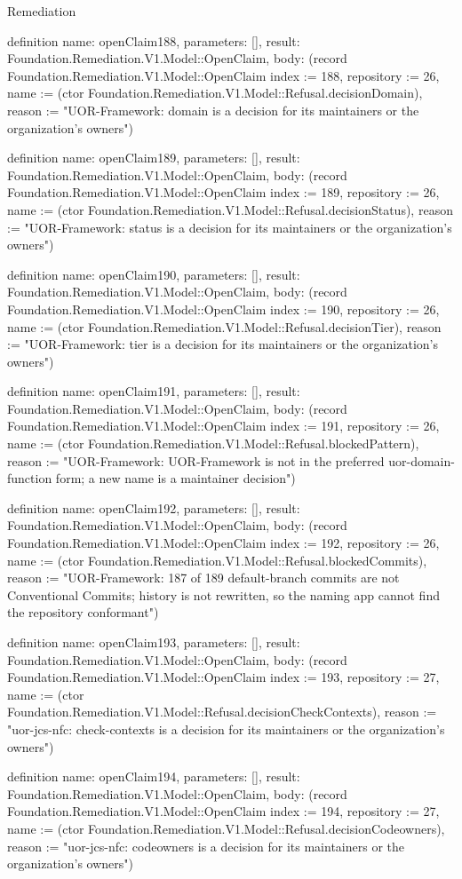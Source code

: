 \begin{lexlean}{Remediation}
\begin{semanticmodule}
definition{
  name: openClaim188,
  parameters: [],
  result: Foundation.Remediation.V1.Model::OpenClaim,
  body: (record Foundation.Remediation.V1.Model::OpenClaim {index := 188, repository := 26, name := (ctor Foundation.Remediation.V1.Model::Refusal.decisionDomain), reason := "UOR-Framework: domain is a decision for its maintainers or the organization's owners"})
}

definition{
  name: openClaim189,
  parameters: [],
  result: Foundation.Remediation.V1.Model::OpenClaim,
  body: (record Foundation.Remediation.V1.Model::OpenClaim {index := 189, repository := 26, name := (ctor Foundation.Remediation.V1.Model::Refusal.decisionStatus), reason := "UOR-Framework: status is a decision for its maintainers or the organization's owners"})
}

definition{
  name: openClaim190,
  parameters: [],
  result: Foundation.Remediation.V1.Model::OpenClaim,
  body: (record Foundation.Remediation.V1.Model::OpenClaim {index := 190, repository := 26, name := (ctor Foundation.Remediation.V1.Model::Refusal.decisionTier), reason := "UOR-Framework: tier is a decision for its maintainers or the organization's owners"})
}

definition{
  name: openClaim191,
  parameters: [],
  result: Foundation.Remediation.V1.Model::OpenClaim,
  body: (record Foundation.Remediation.V1.Model::OpenClaim {index := 191, repository := 26, name := (ctor Foundation.Remediation.V1.Model::Refusal.blockedPattern), reason := "UOR-Framework: UOR-Framework is not in the preferred uor-{domain}-{function} form; a new name is a maintainer decision"})
}

definition{
  name: openClaim192,
  parameters: [],
  result: Foundation.Remediation.V1.Model::OpenClaim,
  body: (record Foundation.Remediation.V1.Model::OpenClaim {index := 192, repository := 26, name := (ctor Foundation.Remediation.V1.Model::Refusal.blockedCommits), reason := "UOR-Framework: 187 of 189 default-branch commits are not Conventional Commits; history is not rewritten, so the naming app cannot find the repository conformant"})
}

definition{
  name: openClaim193,
  parameters: [],
  result: Foundation.Remediation.V1.Model::OpenClaim,
  body: (record Foundation.Remediation.V1.Model::OpenClaim {index := 193, repository := 27, name := (ctor Foundation.Remediation.V1.Model::Refusal.decisionCheckContexts), reason := "uor-jcs-nfc: check-contexts is a decision for its maintainers or the organization's owners"})
}

definition{
  name: openClaim194,
  parameters: [],
  result: Foundation.Remediation.V1.Model::OpenClaim,
  body: (record Foundation.Remediation.V1.Model::OpenClaim {index := 194, repository := 27, name := (ctor Foundation.Remediation.V1.Model::Refusal.decisionCodeowners), reason := "uor-jcs-nfc: codeowners is a decision for its maintainers or the organization's owners"})
}


\end{semanticmodule}
\end{lexlean}
